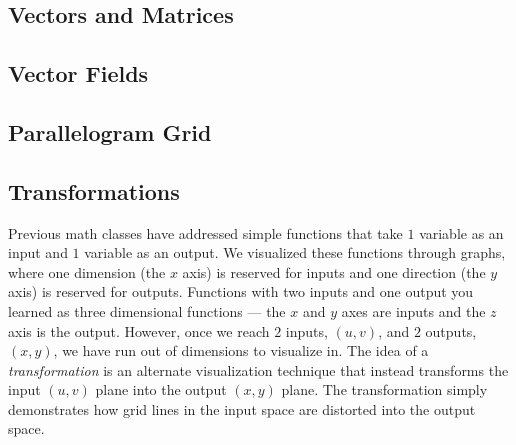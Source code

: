 \documentclass[11pt]{article}
\begin{document}
\subsection{Vectors and Matrices}
\subsection{Vector Fields}
\subsection{Parallelogram Grid}
\subsection{Transformations}
Previous math classes have addressed simple functions that take $1$ variable as an input and $1$ variable as an output. We visualized these functions through graphs, where one dimension (the $x$ axis) is reserved for inputs and one direction (the $y$ axis) is reserved for outputs. Functions with two inputs and one output you learned as three dimensional functions --- the $x$ and $y$ axes are inputs and the $z$ axis is the output. However, once we reach $2$ inputs, $(u,v)$, and $2$ outputs, $(x,y)$, we have run out of dimensions to visualize in. The idea of a \textit{transformation} is an alternate visualization technique that instead transforms the input $(u,v)$ plane into the output $(x,y)$ plane. The transformation simply demonstrates how grid lines in the input space are distorted into the output space.
\end{document}
